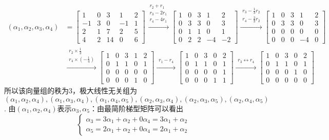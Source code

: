 \documentclass{article}
\begin{document}
\begin{jie}
\begin{align*}
(\alpha_1,\alpha_2,\alpha_3,\alpha_4)&=
\begin{bmatrix}
  1 & 0 & 3 &1 &2\\
  -1 & 3 & 0&-1&1\\
  2 & 1 & 7&2&5\\
  4 & 2 &14&0&6
\end{bmatrix}
\xrightarrow{\substack{r_{2}+r_{1}\\ r_3-2r_1 \\ r_4-4r_1}}
{
\begin{bmatrix}
  1 & 0 & 3 &1&2\\
  0 & 3 & 3&0&3\\
  0 & 1 & 1&0&1\\
  0 & 2 &2&-4&-2
\end{bmatrix}
}
\xrightarrow{\substack{ r_3-\frac{1}{3}r_2 \\ r_4-\frac{2}{3}r_2}}
{
\begin{bmatrix}
  1 & 0 & 3 &1&2\\
  0 & 3 & 3&0&3\\
  0 & 0 & 0&0&0\\
  0 & 0 &0&-4&0
\end{bmatrix}
}\\
&
\xrightarrow{\substack{ r_2\times\frac{1}{3} \\ r_4\times\left(-\frac{1}{4}\right)}}
{
\begin{bmatrix}
  1 & 0 & 3 &1&2\\
  0 & 1 & 1&0&1\\
  0 & 0 & 0&0&0\\
  0 & 0 &0&1&0
\end{bmatrix}
}
\xrightarrow{\substack{ r_1-r_4}}
{
\begin{bmatrix}
  1 & 0 & 3 &0&2\\
  0 & 1 & 1&0&1\\
  0 & 0 & 0&0&1\\
  0 & 0 &0&1&1
\end{bmatrix}
}
\xrightarrow{\substack{ r_3\leftrightarrow r_4}}
{
\begin{bmatrix}
  1 & 0 & 3 &0&2\\
  0 & 1 & 1&0&1\\
  0 & 0 & 0&1& 0\\
  0 & 0 &0&0& 0
\end{bmatrix}
}
\end{align*}
所以该向量组的秩为$3$，极大线性无关组为$(\alpha_1,\alpha_2,\alpha_4),(\alpha_1,\alpha_3,\alpha_4),(\alpha_1,\alpha_4,\alpha_5),(\alpha_2,\alpha_3,\alpha_4),(\alpha_2,\alpha_3,\alpha_5),(\alpha_2,\alpha_4,\alpha_5)$.
由$(\alpha_1,\alpha_2,\alpha_4)$表示$\alpha_3,\alpha_5$：由最简阶梯型矩阵可以看出
\begin{equation*}
\begin{cases}
\alpha_3=3\alpha_1+\alpha_2+0\alpha_4=3\alpha_1+\alpha_2\\ \alpha_5=2\alpha_1+\alpha_2+0\alpha_4=2\alpha_1+\alpha_2
\end{cases}
\end{equation*}

\end{jie}
\end{document}
